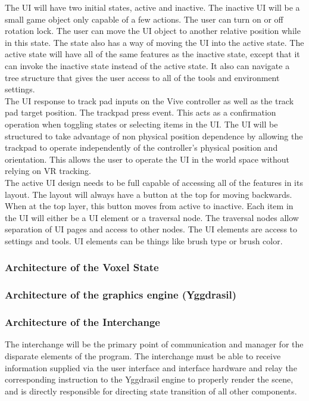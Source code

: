 \documentclass[onecolumn, draftclsnofoot,10pt, compsoc]{IEEEtran}
\begin{document}
The UI will have two initial states, active and inactive. The inactive UI will be a small game object only capable of a few actions. The user can turn on or off rotation lock. The user can move the UI object to another relative position while in this state. The state also has a way of moving the UI into the active state. 
The active state will have all of the same features as the inactive state, except that it can invoke the inactive state instead of the active state. It also can navigate a tree structure that gives the user access to all of the tools and environment settings. \\

The UI response to track pad inputs on the Vive controller as well as the track pad target position. The trackpad press event. This acts as a confirmation operation when toggling states or selecting items in the UI. The UI will be structured to take advantage of non physical position dependence by allowing the trackpad to operate independently of the controller's physical position and orientation. This allows the user to operate the UI in the world space without relying on VR tracking. \\

The active UI design needs to be full capable of accessing all of the features in its layout. The layout will always have a button at the top for moving backwards. When at the top layer, this button moves from active to inactive. Each item in the UI will either be a UI element or a traversal node. The traversal nodes allow separation of UI pages and access to other nodes. The UI elements are access to settings and tools. UI elements can be things like brush type or brush color. \\


\subsubsection{Architecture of the Voxel State}

\subsubsection{Architecture of the graphics engine (Yggdrasil)}

\subsubsection{Architecture of the Interchange}
The interchange will be the primary point of communication and manager for the disparate elements of the program. The interchange must be able to receive information supplied via the user interface and interface hardware and relay the corresponding instruction to the Yggdrasil engine to properly render the scene, and is directly responsible for directing state transition of all other components.
\end{document}
